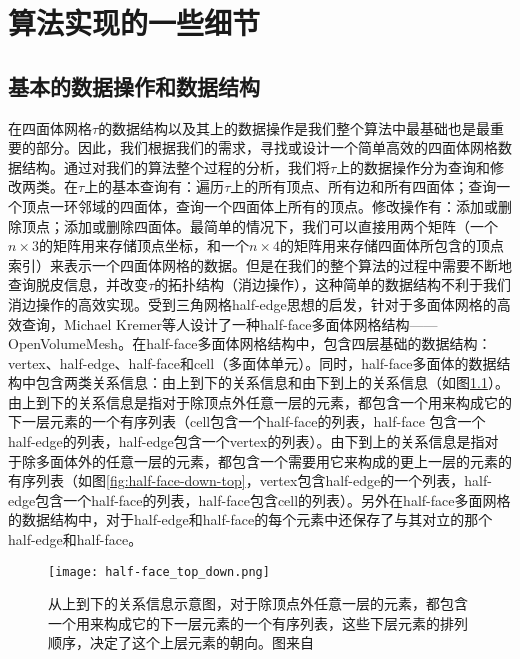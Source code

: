 \chapter{算法实现的一些细节}

\section{基本的数据操作和数据结构}
在四面体网格$\tau$的数据结构以及其上的数据操作是我们整个算法中最基础也是最重要的部分。因此，我们根据我们的需求，寻找或设计一个简单高效的四面体网格数据结构。通过对我们的算法整个过程的分析，我们将$\tau$上的数据操作分为查询和修改两类。在$\tau$上的基本查询有：遍历$\tau$上的所有顶点、所有边和所有四面体；查询一个顶点一环邻域的四面体，查询一个四面体上所有的顶点。修改操作有：添加或删除顶点；添加或删除四面体。最简单的情况下，我们可以直接用两个矩阵（一个$n \times 3$的矩阵用来存储顶点坐标，和一个$n \times 4$的矩阵用来存储四面体所包含的顶点索引）来表示一个四面体网格的数据。但是在我们的整个算法的过程中需要不断地查询脱皮信息，并改变$\tau$的拓扑结构（消边操作），这种简单的数据结构不利于我们消边操作的高效实现。受到三角网格half-edge思想的启发，针对于多面体网格的高效查询，Michael Kremer等人设计了一种half-face多面体网格结构——OpenVolumeMesh\cite{open-volume-mesh}。在half-face多面体网格结构中，包含四层基础的数据结构：vertex、half-edge、half-face和cell（多面体单元）。同时，half-face多面体的数据结构中包含两类关系信息：由上到下的关系信息和由下到上的关系信息（如图\ref{fig:half-face-top-down}）。由上到下的关系信息是指对于除顶点外任意一层的元素，都包含一个用来构成它的下一层元素的一个有序列表（cell包含一个half-face的列表，half-face 包含一个half-edge的列表，half-edge包含一个vertex的列表）。由下到上的关系信息是指对于除多面体外的任意一层的元素，都包含一个需要用它来构成的更上一层的元素的有序列表（如图\ref{fig:half-face-down-top}，vertex包含half-edge的一个列表，half-edge包含一个half-face的列表，half-face包含cell的列表）。另外在half-face多面网格的数据结构中，对于half-edge和half-face的每个元素中还保存了与其对立的那个half-edge和half-face。\par
\begin{figure}[htbp]
    \centering
    \texttt{[image: half-face\_top\_down.png]}
    \caption[half-face从上到下的关系]{从上到下的关系信息示意图，对于除顶点外任意一层的元素，都包含一个用来构成它的下一层元素的一个有序列表，这些下层元素的排列顺序，决定了这个上层元素的朝向。图来自\cite{open-volume-mesh}}
    \label{fig:half-face-top-down}
\end{figure}

